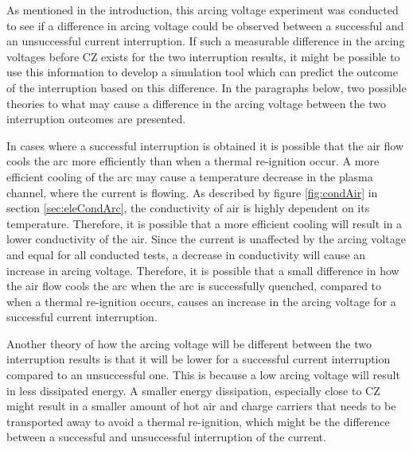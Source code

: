 \documentclass[10pt,b5paper,twoside]{article}
\begin{document}
As mentioned in the introduction, this arcing voltage experiment was conducted to see if a difference in arcing voltage could be observed between a successful and an unsuccessful current interruption. If such a measurable difference in the arcing voltages before CZ exists for the two interruption results, it might be possible to use this information to develop a simulation tool which can predict the outcome of the interruption based on this difference. In the paragraphs below, two possible theories to what may cause a difference in the arcing voltage between the two interruption outcomes are presented.

In cases where a successful interruption is obtained it is possible that the air flow cools the arc more efficiently than when a thermal re-ignition occur. A more efficient cooling of the arc may cause a temperature decrease in the plasma channel, where the current is flowing. As described by figure \ref{fig:condAir} in section \ref{sec:eleCondArc}, the conductivity of air is highly dependent on its temperature. Therefore, it is possible that a more efficient cooling will result in a lower conductivity of the air. Since the current is unaffected by the arcing voltage and equal for all conducted tests, a decrease in conductivity will cause an increase in arcing voltage. Therefore, it is possible that a small difference in how the air flow cools the arc when the arc is successfully quenched, compared to when a thermal re-ignition occurs, causes an increase in the arcing voltage for a successful current interruption.

Another theory of how the arcing voltage will be different between the two interruption results is that it will be lower for a successful current interruption compared to an unsuccessful one. This is because a low arcing voltage will result in less dissipated energy. A smaller energy dissipation, especially close to CZ might result in a smaller amount of hot air and charge carriers that needs to be transported away to avoid a thermal re-ignition, which might be the difference between a successful and unsuccessful interruption of the current.
\end{document}
